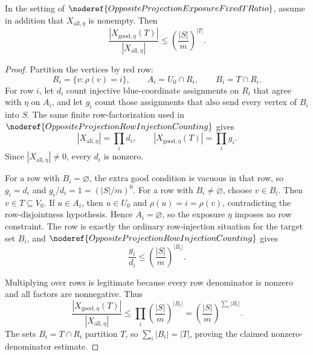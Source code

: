 \begin{helper}
In the setting of \(\noderef{OppositeProjectionExposureFixedTRatio}\), assume
in addition that \(X_{\mathrm{all},\eta}\) is nonempty.  Then
\[
\frac{|X_{\mathrm{good},\eta}(T)|}{|X_{\mathrm{all},\eta}|}
\le
\left(\frac{|S|}{m}\right)^{|T|}.
\]
\end{helper}
\begin{proof}
Partition the vertices by red row:
\[
R_i=\{v:\rho(v)=i\},\qquad A_i=U_0\cap R_i,\qquad B_i=T\cap R_i .
\]
For row \(i\), let \(d_i\) count injective blue-coordinate assignments on
\(R_i\) that agree with \(\eta\) on \(A_i\), and let \(g_i\) count those
assignments that also send every vertex of \(B_i\) into \(S\).  The same
finite row-factorization used in
\(\noderef{OppositeProjectionRowInjectionCounting}\) gives
\[
|X_{\mathrm{all},\eta}|=\prod_i d_i,\qquad
|X_{\mathrm{good},\eta}(T)|=\prod_i g_i.
\]
Since \(|X_{\mathrm{all},\eta}|\ne0\), every \(d_i\) is nonzero.

For a row with \(B_i=\varnothing\), the extra good condition is vacuous in
that row, so \(g_i=d_i\) and \(g_i/d_i=1=(|S|/m)^0\).  For a row with
\(B_i\ne\varnothing\), choose \(v\in B_i\).  Then \(v\in T\subseteq V_0\).
If \(u\in A_i\), then \(u\in U_0\) and \(\rho(u)=i=\rho(v)\), contradicting
the row-disjointness hypothesis.  Hence \(A_i=\varnothing\), so the exposure
\(\eta\) imposes no row constraint.  The row is exactly the ordinary
row-injection situation for the target set \(B_i\), and
\(\noderef{OppositeProjectionRowInjectionCounting}\) gives
\[
\frac{g_i}{d_i}\le\left(\frac{|S|}{m}\right)^{|B_i|}.
\]

Multiplying over rows is legitimate because every row denominator is
nonzero and all factors are nonnegative.  Thus
\[
\frac{|X_{\mathrm{good},\eta}(T)|}{|X_{\mathrm{all},\eta}|}
\le
\prod_i\left(\frac{|S|}{m}\right)^{|B_i|}
=
\left(\frac{|S|}{m}\right)^{\sum_i |B_i|}.
\]
The sets \(B_i=T\cap R_i\) partition \(T\), so \(\sum_i |B_i|=|T|\), proving
the claimed nonzero-denominator estimate.
\end{proof}
